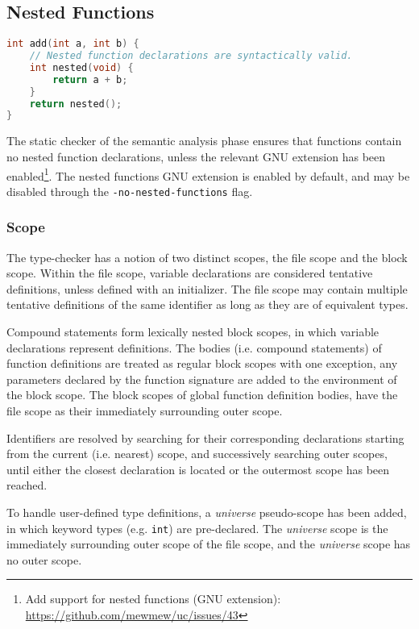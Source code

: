 \subsection{Nested Functions}

\begin{lstlisting}[language=C,style=c,caption={\label{fig:nested_func_decl}Nested function declarations.}]
int add(int a, int b) {
	// Nested function declarations are syntactically valid.
	int nested(void) {
		return a + b;
	}
	return nested();
}
\end{lstlisting}

The static checker of the semantic analysis phase ensures that functions contain no nested function declarations, unless the relevant GNU extension has been enabled\footnote{Add support for nested functions (GNU extension): \url{https://github.com/mewmew/uc/issues/43}}. The nested functions GNU extension is enabled by default, and may be disabled through the \texttt{-no-nested-functions} flag.

\subsubsection{Scope}
\label{sec:scope}

The type-checker has a notion of two distinct scopes, the file scope and the block scope. Within the file scope, variable declarations are considered tentative definitions, unless defined with an initializer. The file scope may contain multiple tentative definitions of the same identifier as long as they are of equivalent types.

Compound statements form lexically nested block scopes, in which variable declarations represent definitions. The bodies (i.e. compound statements) of function definitions are treated as regular block scopes with one exception, any parameters declared by the function signature are added to the environment of the block scope. The block scopes of global function definition bodies, have the file scope as their immediately surrounding outer scope.

Identifiers are resolved by searching for their corresponding declarations starting from the current (i.e. nearest) scope, and successively searching outer scopes, until either the closest declaration is located or the outermost scope has been reached.

To handle user-defined type definitions, a \textit{universe} pseudo-scope has been added, in which keyword types (e.g. \texttt{int}) are pre-declared. The \textit{universe} scope is the immediately surrounding outer scope of the file scope, and the \textit{universe} scope has no outer scope.

